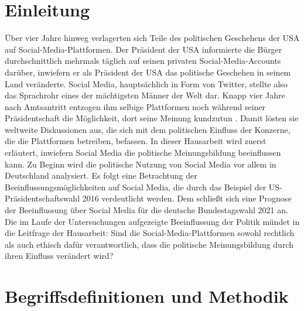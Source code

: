 \section{Einleitung}
Über vier Jahre hinweg verlagerten sich Teile des politischen Geschehens der USA auf Social-Media-Plattformen. Der Präsident der USA informierte die Bürger durchschnittlich mehrmals täglich \autocite[vgl.][]{TrumpAllTweets} auf seinen privaten Social-Media-Accounts darüber, inwiefern er als Präsident der USA das politische Geschehen in seinem Land veränderte. Social Media, hauptsächlich in Form von Twitter, stellte also das Sprachrohr eines der mächtigsten Männer der Welt \autocite[vgl.][]{MächtigTrump} dar. Knapp vier Jahre nach Amtsantritt entzogen ihm selbige Plattformen noch während seiner Präsidentschaft die Möglichkeit, dort seine Meinung kundzutun \autocite[vgl.][]{BanTrumpFBInsta}\autocite[vgl.][]{BanTrumpTwitter}. Damit lösten sie weltweite Diskussionen aus, die sich mit dem politischen Einfluss der Konzerne, die die Plattformen betreiben, befassen.
In dieser Hausarbeit wird zuerst erläutert, inwiefern Social Media die politische Meinungsbildung beeinflussen kann. Zu Beginn wird die politische Nutzung von Social Media vor allem in Deutschland analysiert. Es folgt eine Betrachtung der Beeinflussungsmöglichkeiten auf Social Media, die durch das Beispiel der US-Präsidentschaftswahl 2016 verdeutlicht werden. Dem schließt sich eine Prognose der Beeinflussung über Social Media für die deutsche Bundestagswahl 2021 an. Die im Laufe der Untersuchungen aufgezeigte Beeinflussung der Politik mündet in die Leitfrage der Hausarbeit: Sind die Social-Media-Plattformen sowohl rechtlich als auch ethisch dafür verantwortlich, dass die politische Meinungsbildung durch ihren Einfluss verändert wird?

\section{Begriffsdefinitionen und Methodik}
